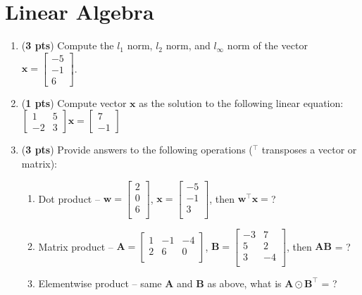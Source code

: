 \documentclass[11pt, letterpaper]{article}
\begin{document}
\newpage
\section{Linear Algebra}
\begin{enumerate}[label=(\alph*)]

	\item (\textbf{3 pts}) Compute the $l_1$ norm, $l_2$ norm, and $l_\infty$ norm of the vector $\mathbf{x}=\begin{bmatrix} -5 \\ -1 \\ 6 \end{bmatrix}$.
	
	\item (\textbf{1 pts}) Compute vector $\mathbf{x}$ as the solution to the following linear equation:
	       $
	       \begin{bmatrix} 
                1 & 5 \\
                -2 & 3 
           \end{bmatrix}
           \mathbf{x} =
           \begin{bmatrix} 
                7  \\
                -1
           \end{bmatrix}
           $
           
	\item (\textbf{3 pts}) Provide answers to the following operations ($^\top$ transposes a vector or matrix):
	\begin{enumerate}[label=(\roman*)]
	
        \item Dot product -- $\mathbf{w} = \begin{bmatrix}
2\\
0\\
6\\
\end{bmatrix}$, $\mathbf{x}= \begin{bmatrix}
-5\\
-1\\
3\\
\end{bmatrix}$, then $\mathbf{w}^\top\mathbf{x} = $?
        \item Matrix product --
	       $\mathbf{A} = \begin{bmatrix} 
                1 &  -1 & -4\\
                2 & 6 & 0\\
           \end{bmatrix}$, 
           $\mathbf{B} = \begin{bmatrix} 
                -3 & 7\\
                5 & 2\\
                3 & -4\\
            \end{bmatrix}$, then $\mathbf{A}\mathbf{B}$ = ?
           

        \item Elementwise product -- same $\mathbf{A}$ and $\mathbf{B}$ as above, what is $\mathbf{A}\odot\mathbf{B^\top}$ = ?
    \end{enumerate}
\end{enumerate}
\end{document}
